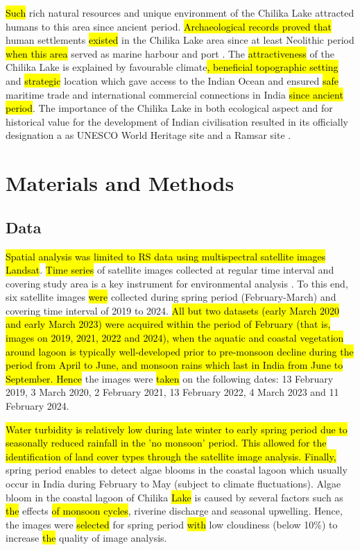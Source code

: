 \documentclass[jmse,article,submit,pdftex,moreauthors]{Definitions/mdpi}
\begin{document}
\hl{Such }rich natural resources and unique environment of the Chilika Lake attracted humans to this area since ancient period. \hl{Archaeological records proved that} human settlements \hl{existed} in the Chilika Lake area\hl{ }since at least Neolithic period \hl{when this area} served as marine harbour and port  \cite{DASH2022105190}. The \hl{attractiveness} of the Chilika Lake is explained by\hl{ }favourable climate\hl{, beneficial topographic setting} and \hl{strategic} location which gave access to the Indian Ocean and ensured \hl{safe }maritime trade and international commercial connections in\hl{ }India \hl{since ancient period}. The importance of the Chilika Lake in both ecological aspect and for historical value for the development of Indian civilisation resulted in its officially designation a as UNESCO World Heritage site \cite{SETHY2023497} and a Ramsar site \cite{BHUVANAGIRI2018343}.

\section{Materials and Methods}

\subsection{Data}

\hl{Spatial analysis was limited to RS data using multispectral satellite images Landsat}. \hl{Time series} of satellite images collected at regular time interval and covering study area is a key instrument for environmental analysis \cite{Lemenkova202324}. To this end,\hl{ }six satellite images \hl{were }collected during spring period (February-March) and covering time interval of 2019 to 2024. \hl{All but two datasets (early March 2020 and early March 2023) were acquired within the period of February (that is, images on 2019, 2021, 2022 and 2024), when the aquatic and coastal vegetation around lagoon is typically well-developed prior to pre-monsoon decline during the period from April to June, and monsoon rains which last in India from June to September. Hence} the images were \hl{taken } on the following dates: 13 February 2019, 3 March 2020, 2 February 2021, 13 February 2022, 4 March 2023 and 11 February 2024. 

\hl{Water turbidity is relatively low during late winter to early spring period due to seasonally reduced rainfall in the 'no monsoon' period. This allowed for the identification of land cover types through the satellite image analysis. Finally, }spring period enables to detect algae blooms in the coastal lagoon which usually occur in India\hl{ }during February to May (subject to climate fluctuations). Algae bloom in the coastal lagoon of Chilika \hl{Lake }is caused by several factors such as \hl{the} effects \hl{of monsoon cycles}, riverine discharge and seasonal upwelling. Hence, the images were \hl{selected }for spring period \hl{with} low cloudiness (below 10\%) to increase \hl{the }quality of image analysis. 
\end{document}
